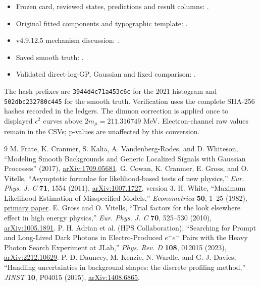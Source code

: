 \documentclass[11pt]{article}
\newcommand{\eps}{\ensuremath{\epsilon}}
\begin{document}
\begin{itemize}
\item Frozen card, reviewed states, predictions and result columns:
.
\item Original fitted components and typographic template:
.
\item v4.9.12.5 mechanism discussion:
.
\item Saved smooth truth:
.
\item Validated direct-log-GP, Gaussian and fixed comparison:
.
\end{itemize}

The hash prefixes are \texttt{3944d4c71a453c6c} for the 2021 histogram and
\texttt{502dbc232780c445} for the smooth truth. Verification uses the complete
SHA-256 hashes recorded in the ledgers.
The dimuon correction is applied once to displayed $\eps^2$ curves above
$2m_\mu=211.316749$ MeV. Electron-channel raw values remain in the CSVs;
p-values are unaffected by this conversion.

\begin{thebibliography}{9}
 M. Frate, K. Cranmer, S. Kalia, A. Vandenberg-Rodes,
and D. Whiteson, ``Modeling Smooth Backgrounds and Generic Localized Signals
with Gaussian Processes'' (2017),
\href{https://arxiv.org/abs/1709.05681}{arXiv:1709.05681}.
 G. Cowan, K. Cranmer, E. Gross, and O. Vitells,
``Asymptotic formulae for likelihood-based tests of new physics,''
\emph{Eur. Phys. J. C} \textbf{71}, 1554 (2011),
\href{https://arxiv.org/abs/1007.1727}{arXiv:1007.1727}, version 3.
 H. White, ``Maximum Likelihood Estimation of Misspecified
Models,'' \emph{Econometrica} \textbf{50}, 1--25 (1982),
\href{https://faculty.utrgv.edu/diego.escobari/teaching/Econ8370/Papers/White(1982)Econometrica-Corey.pdf}{primary paper}.
 E. Gross and O. Vitells, ``Trial factors for the look
elsewhere effect in high energy physics,'' \emph{Eur. Phys. J. C}
\textbf{70}, 525--530 (2010),
\href{https://arxiv.org/abs/1005.1891}{arXiv:1005.1891}.
 P. H. Adrian et al. (HPS Collaboration), ``Searching for Prompt
and Long-Lived Dark Photons in Electro-Produced $e^+e^-$ Pairs with the Heavy
Photon Search Experiment at JLab,'' \emph{Phys. Rev. D} \textbf{108}, 012015
(2023), \href{https://arxiv.org/abs/2212.10629}{arXiv:2212.10629}.
 P. D. Dauncey, M. Kenzie, N. Wardle, and G. J. Davies,
``Handling uncertainties in background shapes: the discrete profiling
method,'' \emph{JINST} \textbf{10}, P04015 (2015),
\href{https://arxiv.org/abs/1408.6865}{arXiv:1408.6865}.
\end{thebibliography}
\end{document}
